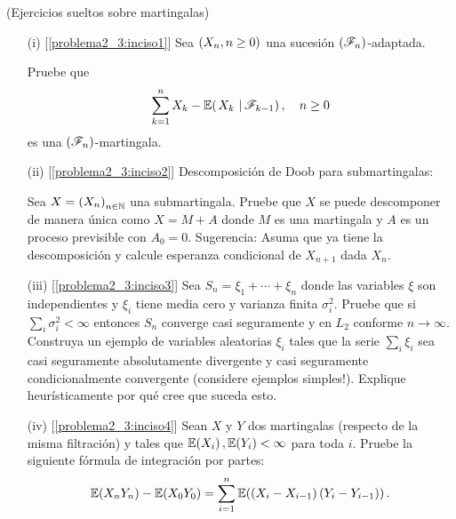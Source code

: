 \begin{problema}(Ejercicios sueltos sobre martingalas)\pn
    \begin{enumerate}
        \item[(i)]        [\ref{problema2_3:inciso1}]
            Sea $\left( X_n,n\geq 0\right) $ una sucesi\'on $\left( \mathscr{F}_n\right) $-adaptada.\par
            Pruebe que        
            \begin{align}
                \sum_{k=1}^n X_k-\espc{X_k}{\F_{k-1}}, \quad n\geq 0
            \end{align}
            es una $\left( \mathscr{F}_n\right) $-martingala.\pn
        
        \item[(ii)]        [\ref{problema2_3:inciso2}]
            Descomposici\'on de Doob para submartingalas:\par
            Sea $X=\left( X_n\right) _{n\in\mathbb{N}}$ una submartingala. 
            Pruebe que $X$ se puede descomponer de manera \'unica como $X=M+A$ donde $M$ es una martingala y $A$ 
            es un proceso previsible con $A_0=0$. Sugerencia: Asuma que ya tiene la descomposici\'on y calcule 
            esperanza condicional de $X_{n+1}$ dada $X_n$.\pn 
        
        \item[(iii)]    [\ref{problema2_3:inciso3}]
            Sea $S_n=\xi_1+\cdots+\xi_n$ donde las variables $\xi$ son independientes y $\xi_i$ tiene 
            media cero y varianza finita $\sigma_i^2$. Pruebe que si $\sum_i \sigma_i^2<\infty$ entonces 
            $S_n$ converge casi seguramente y en $L_2$ conforme $n\to\infty$. Construya un ejemplo de 
            variables aleatorias $\xi_i$ tales que la serie $\sum_i \xi_i$ sea casi seguramente absolutamente 
            divergente y casi seguramente condicionalmente convergente (considere ejemplos simples!). 
            Explique heur\'isticamente por qu\'e cree que suceda esto.\pn
        
        \item[(iv)]        [\ref{problema2_3:inciso4}]
            Sean $X$ y $Y$ dos martingalas (respecto de la misma filtraci\'on) y tales que $\mathbb{E}\! \left( X_i \right),\mathbb{E}\! \left( Y_i \right)<\infty$ 
            para toda $i$. Pruebe la siguiente f\'ormula de integraci\'on por partes: 
            \begin{align}
                \mathbb{E}\! \left( X_nY_n \right)-\mathbb{E}\! \left( X_0Y_0 \right)=\sum_{i=1}^n \mathbb{E}\! \left( \left( X_i-X_{i-1}\right) \left( Y_i-Y_{i-1}\right)  \right). 
            \end{align}\pn
        

\end{enumerate}
\end{problema}
